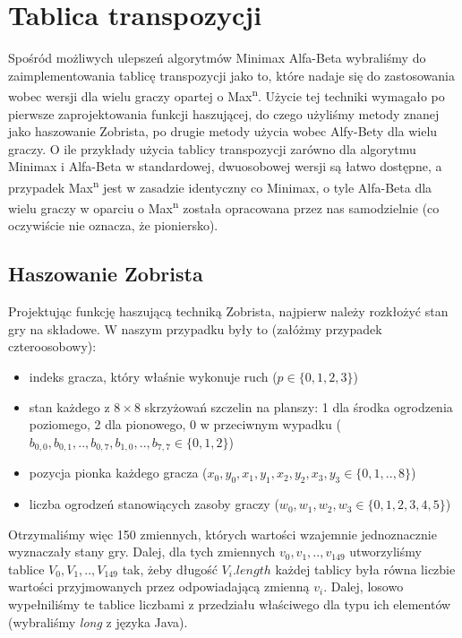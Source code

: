 \documentclass{pracamgr}
\begin{document}
\section{Tablica transpozycji}

Spośród możliwych ulepszeń algorytmów Minimax Alfa-Beta wybraliśmy do zaimplementowania tablicę transpozycji jako to, które nadaje się do zastosowania wobec wersji dla wielu graczy opartej o Max\textsuperscript{n}.
Użycie tej techniki wymagało po pierwsze zaprojektowania funkcji haszującej, do czego użyliśmy metody znanej jako haszowanie Zobrista, po drugie metody użycia wobec Alfy-Bety dla wielu graczy.
O ile przykłady użycia tablicy transpozycji zarówno dla algorytmu Minimax i Alfa-Beta w standardowej, dwuosobowej wersji są łatwo dostępne, a przypadek Max\textsuperscript{n} jest w zasadzie identyczny co Minimax, o tyle Alfa-Beta dla wielu graczy w oparciu o Max\textsuperscript{n} została opracowana przez nas samodzielnie (co oczywiście nie oznacza, że pioniersko).

\subsection{Haszowanie Zobrista}

Projektując funkcję haszującą techniką Zobrista, najpierw należy rozkłożyć stan gry na składowe.
W naszym przypadku były to (załóżmy przypadek czteroosobowy):

\begin{itemize}
\item indeks gracza, który właśnie wykonuje ruch (\(p \in \{0, 1, 2, 3\}\))
\item stan każdego z \(8 \times 8\) skrzyżowań szczelin na planszy: 1 dla środka ogrodzenia poziomego, 2 dla pionowego, 0 w przeciwnym wypadku (\( b_{0, 0}, b_{0, 1}, .., b_{0, 7}, b_{1, 0}, .., b_{7, 7} \in \{0, 1, 2\}\))
\item pozycja pionka każdego gracza (\(x_0, y_0, x_1, y_1, x_2, y_2, x_3, y_3 \in \{0, 1, .., 8\}\))
\item liczba ogrodzeń stanowiących zasoby graczy (\(w_0, w_1, w_2, w_3 \in \{0, 1, 2, 3, 4, 5\}\))
\end {itemize}

Otrzymaliśmy więc 150 zmiennych, których wartości wzajemnie jednoznacznie wyznaczały stany gry.
Dalej, dla tych zmiennych \(v_0, v_1, .., v_{149}\) utworzyliśmy tablice \(V_0, V_1, .., V_{149}\) tak, żeby długość \(V_i.length\) każdej tablicy była równa liczbie wartości przyjmowanych przez odpowiadającą zmienną \(v_i\).
Dalej, losowo wypełniliśmy te tablice liczbami z przedziału właściwego dla typu ich elementów (wybraliśmy \emph{long} z języka Java).
\end{document}
